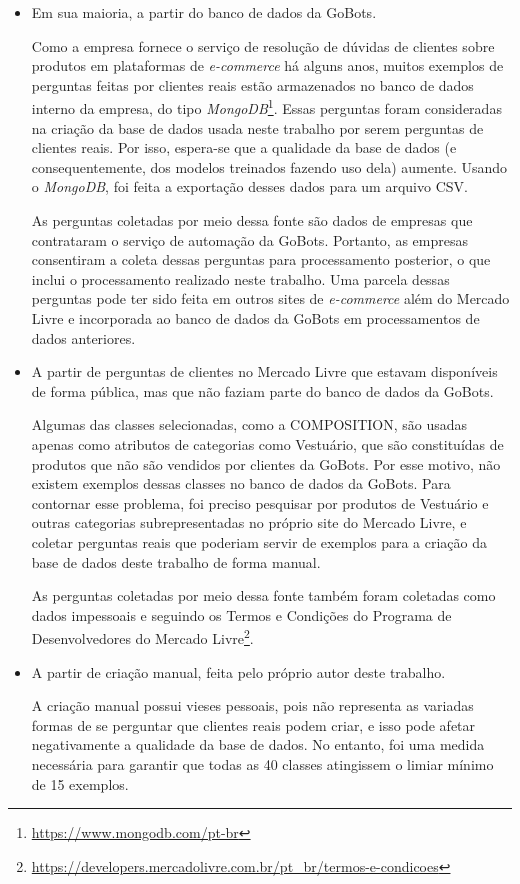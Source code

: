 \begin{itemize}
  \item Em sua maioria, a partir do banco de dados da GoBots.
  
  Como a empresa fornece o serviço de resolução de dúvidas de clientes sobre produtos em plataformas de \textit{e-commerce} há alguns anos, muitos exemplos de perguntas feitas por clientes reais estão armazenados no banco de dados interno da empresa, do tipo \textit{MongoDB}\footnote{\url{https://www.mongodb.com/pt-br}}. Essas perguntas foram consideradas na criação da base de dados usada neste trabalho por serem perguntas de clientes reais. Por isso, espera-se que a qualidade da base de dados (e consequentemente, dos modelos treinados fazendo uso dela) aumente. Usando o \textit{MongoDB}, foi feita a exportação desses dados para um arquivo CSV.

  As perguntas coletadas por meio dessa fonte são dados de empresas que contrataram o serviço de automação da GoBots. Portanto, as empresas consentiram a coleta dessas perguntas para processamento posterior, o que inclui o processamento realizado neste trabalho. Uma parcela dessas perguntas pode ter sido feita em outros sites de \textit{e-commerce} além do Mercado Livre e incorporada ao banco de dados da GoBots em processamentos de dados anteriores.
  
  \item A partir de perguntas de clientes no Mercado Livre que estavam disponíveis de forma pública, mas que não faziam parte do banco de dados da GoBots.

  Algumas das classes selecionadas, como a COMPOSITION, são usadas apenas como atributos de categorias como Vestuário, que são constituídas de produtos que não são vendidos por clientes da GoBots. Por esse motivo, não existem exemplos dessas classes no banco de dados da GoBots. Para contornar esse problema, foi preciso pesquisar por produtos de Vestuário e outras categorias subrepresentadas no próprio site do Mercado Livre, e coletar perguntas reais que poderiam servir de exemplos para a criação da base de dados deste trabalho de forma manual.

  As perguntas coletadas por meio dessa fonte também foram coletadas como dados impessoais e seguindo os Termos e Condições do Programa de Desenvolvedores do Mercado Livre\footnote{\url{https://developers.mercadolivre.com.br/pt_br/termos-e-condicoes}}.
  
  \item A partir de criação manual, feita pelo próprio autor deste trabalho.

  A criação manual possui vieses pessoais, pois não representa as variadas formas de se perguntar que clientes reais podem criar, e isso pode afetar negativamente a qualidade da base de dados. No entanto, foi uma medida necessária para garantir que todas as 40 classes atingissem o limiar mínimo de 15 exemplos.
\end{itemize}

